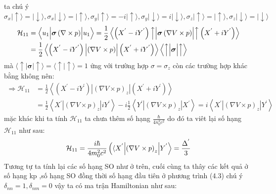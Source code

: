 \begin{enumerate}
ta chú ý $\sigma_x|\uparrow\rangle = |\downarrow\rangle,\sigma_x|\downarrow\rangle = |\uparrow\rangle,\sigma_y|\uparrow\rangle = -i|\uparrow\rangle,\sigma_y|\downarrow\rangle = i|\downarrow\rangle,\sigma_z|\uparrow\rangle = |\uparrow\rangle,\sigma_z|\downarrow \rangle = |\downarrow\rangle$
\begin{align*}
\mathcal{H}_{11}&=\Bigl\langle u_1\Bigl\vert \boldsymbol{\sigma}\left(\nabla\times p\right)\Bigr\vert u_1\Bigr\rangle =
 \frac{1}{2}\left\langle \left(X^{'}-iY^{'}\right)\Bigl\uparrow \Bigl\vert \boldsymbol{\sigma}\left(\nabla V\times p\right)\Bigr\vert \Bigr\uparrow \left(X^{'}+iY^{'}\right)\right\rangle \\
 &=\frac{1}{2}\left\langle \left(X^{'}-iY^{'}\right) \Bigl\vert \left(\nabla V\times p\right)\Bigr\vert \left(X^{'}+iY^{'}\right)\right\rangle \left\langle \Bigl\uparrow \Bigl\vert \boldsymbol{\sigma}\Bigr\vert \Bigr\uparrow\right\rangle
\end{align*}
mà $\langle \uparrow|\boldsymbol{\sigma}|\uparrow\rangle = \langle \uparrow|\uparrow\rangle=1$ ứng với trường hợp $\sigma=\sigma_z$ còn các trường hợp khác bằng không nên:
\begin{align*}
\Longrightarrow
\mathcal{H}_{11}&= \frac{1}{2}\left\langle \left(X^{'}-iY^{'}\right) \left |\left(\nabla V\times p\right)_z\right | \left(X^{'}+iY^{'}\right)\right\rangle \\
&= \frac{1}{2}\left\langle X^{'} \left |\left(\nabla V\times p\right)_z\right | iY^{'}\right\rangle -i \frac{1}{2}\left\langle Y^{'} \left |\left(\nabla V\times p\right)_z\right |X^{'}\right\rangle = i\left\langle X^{'} \left |\left(\nabla V\times p\right)_z\right | Y^{'}\right\rangle
\end{align*}
mặc khác khi ta tính $\mathcal{H}_{11}$ ta chưa thêm số hạng $\frac{\hbar}{4n_0^2c^2}$ do đó ta viêt lại số hạng $\mathcal{H}_{11}$ như sau:
\begin{equation}
\mathcal{H}_{11}=\frac{i\hbar}{4m_0^2c^2}\left(\langle X^{'}\Bigl\vert \left(\nabla V\times p\right)_z\Bigr\vert Y^{'}\right\rangle = \frac{\Delta^{'}}{3}
\end{equation}
Tương tự ta tính lại các số hạng SO như ở trên, cuối cùng ta thây các kết quả ở số hạng kp ,số hạng SO đồng thời số hạng đầu tiên ở phương trình (4.3) chú ý $\delta_{nn}=1,\delta_{nm}=0$ vậy ta có ma trận Hamiltonian như sau:
\end{enumerate}
